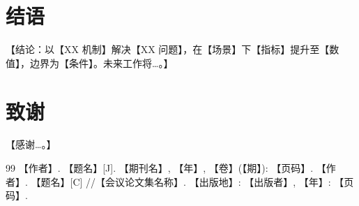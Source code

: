 \documentclass[twocolumn,10pt]{ctexart}
\let\heiti\heifamily
\begin{document}
\section{\heiti\fontsize{11.5}{15}\selectfont 结\quad 语}
【结论：以【XX 机制】解决【XX 问题】，在【场景】下【指标】提升至【数值】，边界为【条件】。未来工作将…。】

\section*{\heiti\fontsize{11.5}{15}\selectfont 致\quad 谢}
【感谢…。】

\begin{thebibliography}{99}
\fontsize{8}{10}\selectfont
{} 【作者】. 【题名】[J]. 【期刊名】, 【年】, 【卷】(【期】): 【页码】.
 【作者】. 【题名】[C] //【会议论文集名称】. 【出版地】: 【出版者】, 【年】: 【页码】.
\end{thebibliography}
\end{document}
